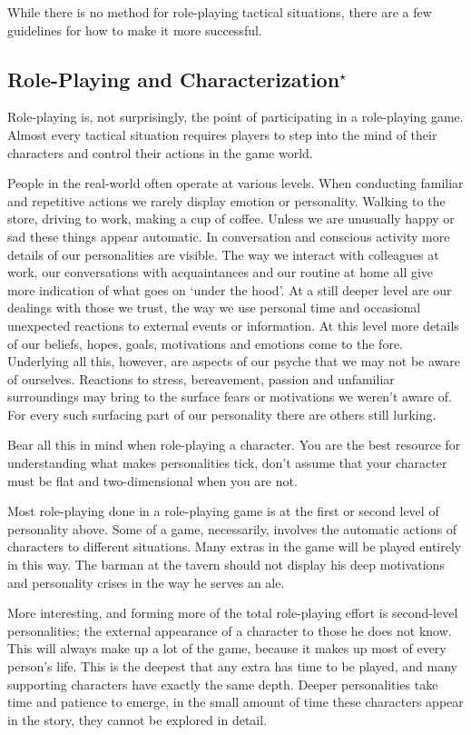 \documentclass[twoside]{book}
\begin{document}
While there is no method for role-playing tactical situations, there
are a few guidelines for how to make it more successful.

\subsection{Role-Playing and Characterization$^\star$} %

Role-playing is, not surprisingly, the point of participating in a
role-playing game. Almost every tactical situation requires players to
step into the mind of their characters and control their actions in
the game world.

People in the real-world often operate at various levels. When
conducting familiar and repetitive actions we rarely display emotion
or personality. Walking to the store, driving to work, making a cup of
coffee. Unless we are unusually happy or sad these things appear
automatic. In conversation and conscious activity more details of our
personalities are visible. The way we interact with colleagues at
work, our conversations with acquaintances and our routine at home all
give more indication of what goes on `under the hood'. At a still
deeper level are our dealings with those we trust, the way we use
personal time and occasional unexpected reactions to external events
or information. At this level more details of our beliefs, hopes,
goals, motivations and emotions come to the fore. Underlying all this,
however, are aspects of our psyche that we may not be aware of
ourselves. Reactions to stress, bereavement, passion and unfamiliar
surroundings may bring to the surface fears or motivations we weren't
aware of. For every such surfacing part of our personality there are
others still lurking.

Bear all this in mind when role-playing a character. You are the best
resource for understanding what makes personalities tick, don't assume
that your character must be flat and two-dimensional when you are not.

Most role-playing done in a role-playing game is at the first or
second level of personality above. Some of a game, necessarily,
involves the automatic actions of characters to different
situations. Many extras in the game will be played entirely in this
way. The barman at the tavern should not display his deep motivations
and personality crises in the way he serves an ale.

More interesting, and forming more of the total role-playing effort is
second-level personalities; the external appearance of a character to
those he does not know. This will always make up a lot of the game,
because it makes up most of every person's life. This is the deepest
that any extra has time to be played, and many supporting characters
have exactly the same depth. Deeper personalities take time and
patience to emerge, in the small amount of time these characters
appear in the story, they cannot be explored in detail.
\end{document}
